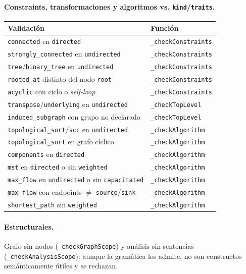 \documentclass[11pt,a4paper]{article}
\newcommand{\code}[1]{\texttt{#1}}
\begin{document}
\paragraph{Constraints, transformaciones y algoritmos vs. \code{kind}/\code{traits}.}
\begin{center}
\begin{tabular}{@{}ll@{}}
\toprule
\textbf{Validación} & \textbf{Función} \\
\midrule
\code{connected} en \code{directed}        & \code{\_checkConstraints} \\
\code{strongly\_connected} en \code{undirected} & \code{\_checkConstraints} \\
\code{tree}/\code{binary\_tree} en \code{undirected} & \code{\_checkConstraints} \\
\code{rooted\_at} distinto del nodo \code{root} & \code{\_checkConstraints} \\
\code{acyclic} con ciclo o \emph{self-loop} & \code{\_checkConstraints} \\
\code{transpose}/\code{underlying} en \code{undirected} & \code{\_checkTopLevel} \\
\code{induced\_subgraph} con grupo no declarado & \code{\_checkTopLevel} \\
\code{topological\_sort}/\code{scc} en \code{undirected} & \code{\_checkAlgorithm} \\
\code{topological\_sort} en grafo cíclico  & \code{\_checkAlgorithm} \\
\code{components} en \code{directed}       & \code{\_checkAlgorithm} \\
\code{mst} en \code{directed} o sin \code{weighted} & \code{\_checkAlgorithm} \\
\code{max\_flow} en \code{undirected} o sin \code{capacitated} & \code{\_checkAlgorithm} \\
\code{max\_flow} con endpoints $\neq$ \code{source}/\code{sink} & \code{\_checkAlgorithm} \\
\code{shortest\_path} sin \code{weighted}  & \code{\_checkAlgorithm} \\
\bottomrule
\end{tabular}
\end{center}

\paragraph{Estructurales.}
Grafo sin nodos (\code{\_checkGraphScope}) y análisis sin sentencias
(\code{\_checkAnalysisScope}): aunque la gramática los admite, no son
constructos semánticamente útiles y se rechazan.
\end{document}
